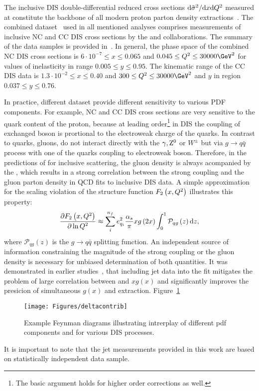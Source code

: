 The inclusive DIS double-differential reduced cross sections $\mathrm{d}\tilde\sigma^2/\mathrm{d}x\mathrm{d}\mbox{${Q^2}$}$ measured at \hera constitute the backbone of all modern proton parton density extractions~\cite{Lai:2010vv,Martin:2009iq,Alekhin:2012ig,Ball:2011uy,Aaron:2009aa}. The combined dataset~\cite{Aaron:2009aa} used in all mentioned analyses comprises measurements of inclusive NC and CC DIS cross sections by the \hone and \zeus collaborations. The summary of the data samples is provided in~\cite{Aaron:2009aa}. In general, the phase space of the combined NC DIS cross sections is $6\cdot 10^{-7} \le x \le 0.065$ and $0.045 \le \qsq \le 30000 \GeV^2$ for values of inelasticity in range $0.005 \le y \le 0.95$. The kinematic range of the CC DIS data is $1.3\cdot 10^{-2} \le x \le 0.40$ and $300 \le \qsq \le 30000 \GeV^2$ and $y$ in region $0.037 \le y \le 0.76$.

In practice, different dataset provide different sensitivity to various PDF components. For example, NC and CC DIS cross sections are very sensitive to the quark content of the proton, because at leading order\footnote{The basic argument holds for higher order corrections as well.} in DIS the coupling of exchanged boson is prortional to the electroweak charge of the quarks. In contrast to quarks, gluons, do not interact directly with the $\gamma,\mbox{$\rm{Z}^0$}$ or $W^{\pm}$ but via $g\rightarrow q\bar q$ process with one of the quarks coupling to electroweak boson. Therefore, in the predictions of for inclusive \ep scattering, the gluon density is always acompanied by the \as, which results in a strong correlation between the strong coupling and the gluon parton density in QCD fits to inclusive DIS data. A simple approximation~\cite{Prytz:1993vr} for the scaling violation of the structure function $F_2\left(x,\mbox{${Q^2}$} \right)$ illustrates this property:
\begin{equation}
 \frac{\partial F_2\left(x,\mbox{${Q^2}$} \right)}{\partial \ln \mbox{${Q^2}$}} \approx \sum_i^{n_f}e_{q_i}^2 \frac{\mbox{$\alpha_{s}$}}{\pi} xg\left(2x\right) \int_0^1 \mathcal{P}_{qg}\left(z\right)\mathrm{d}z, 
\end{equation}
where $\mathcal{P}_{qg}\left(z\right)$ is the $g\rightarrow q\bar q$ splitting function. An independent source of information constraining the magnitude of the strong coupling or the gluon density is necessary for unbiased determination of both quantities. It was demonstrated in earlier studies~\cite{Chekanov:2005nn,H1prelim-11-143,ZEUS-prel-11-010}, that including jet data into the fit mitigates the problem of large correlation between \as and $xg\left(x\right)$ and significantly improves the presicion of simultaneous $g\left(x\right)$ and \as extraction. Figure~\ref{fig:pdfcontributions}
\begin{figure}[htp]
 \centering
 \begin{center}
 \texttt{[image: Figures/deltacontrib]}
\end{center}
 \caption{Example Feynman diagrams illustrating intrerplay of different pdf components and \as for various DIS processes.}
 \label{fig:pdfcontributions}
\end{figure}


It is important to note that the jet measurements provided in this work are based on statistically independent data sample.